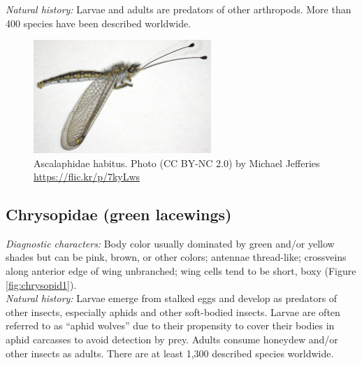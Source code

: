 \documentclass[letterpaper, 11pt]{article}
\begin{document}
\noindent{}\textit{Natural history:} Larvae and adults are predators of other arthropods. More than 400 species have been described worldwide.\\

\begin{figure}[ht!]
  \centering
    \includegraphics[width=0.6\textwidth]{AscalaphidHabitus}
  \caption{Ascalaphidae habitus. Photo (CC BY-NC 2.0) by Michael Jefferies \url{https://flic.kr/p/7kyLws}}
  \label{fig:ascalaph}
\end{figure}

\subsection{Chrysopidae (green lacewings)}
\noindent{}\textit{Diagnostic characters:} Body color usually dominated by green and/or yellow shades but can be pink, brown, or other colors; antennae thread-like; crossveins along anterior edge of wing unbranched; wing cells tend to be short, boxy (Figure \ref{fig:chrysopid1}).\\

\noindent{}\textit{Natural history:} Larvae emerge from stalked eggs and develop as predators of other insects, especially aphids and other soft-bodied insects. Larvae are often referred to as ``aphid wolves'' due to their propensity to cover their bodies in aphid carcasses to avoid detection by prey. Adults consume honeydew and/or other insects as adults. There are at least 1,300 described species worldwide.\\
\end{document}
